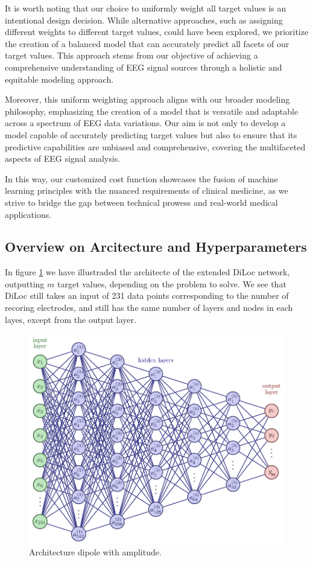 \documentclass[a4paper, UKenglish, 11pt]{uiomaster}
\begin{document}
It is worth noting that our choice to uniformly weight all target values is an intentional design decision. While alternative approaches, such as assigning different weights to different target values, could have been explored, we prioritize the creation of a balanced model that can accurately predict all facets of our target values. This approach stems from our objective of achieving a comprehensive understanding of EEG signal sources through a holistic and equitable modeling approach.

Moreover, this uniform weighting approach aligns with our broader modeling philosophy, emphasizing the creation of a model that is versatile and adaptable across a spectrum of EEG data variations. Our aim is not only to develop a model capable of accurately predicting target values but also to ensure that its predictive capabilities are unbiased and comprehensive, covering the multifaceted aspects of EEG signal analysis.

In this way, our customized cost function showcases the fusion of machine learning principles with the nuanced requirements of clinical medicine, as we strive to bridge the gap between technical prowess and real-world medical applications.



\subsection{Overview on Arcitecture and Hyperparameters}
In figure \ref{fig:NN_dipole_w_amplitude_architecture} we have illustraded the architecte of the extended DiLoc network, outputting $m$ target values, depending on the problem to solve. We see that DiLoc still takes an input of 231 data points corresponding to the number of recoring electrodes, and still has the same number of layers and nodes in each layes, except from the output layer.

\begin{figure}[!htb]
    \centering
    \includegraphics[width=\linewidth]{figures/NN_multiple_outputs.pdf}
    \caption{Architecture dipole with amplitude.}
    \label{fig:NN_dipole_w_amplitude_architecture}
\end{figure}
\end{document}
